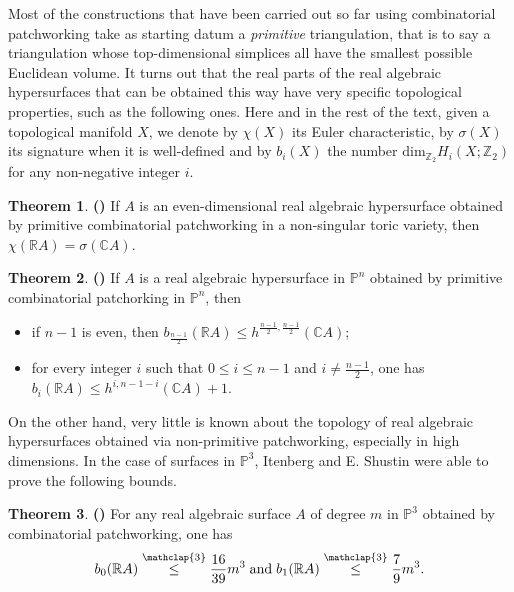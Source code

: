 \documentclass[12pt]{article}
\newcommand\customleqtrois{\stackrel{\mathclap{\normalfont\scriptsize\mbox{3}}}{\leq}}
\newcommand{\R}{\mathbb{R}}
\renewcommand{\P}{\mathbb{P}}
\newcommand{\Z}{\mathbb{Z}}
\theoremstyle{definition}
\newtheorem*{thm*}{Theorem}
\begin{document}
Most of the constructions that have been carried out so far using combinatorial patchworking take as starting datum a \textit{primitive} triangulation, that is to say a triangulation whose top-dimensional simplices all have the smallest possible Euclidean volume. It turns out that the real parts of the real algebraic hypersurfaces that can be obtained this way have very specific topological properties, such as the following ones. Here and in the rest of the text, given a topological manifold $X$, we denote by $\chi(X)$ its Euler characteristic, by $\sigma(X)$ its signature when it is well-defined and by $b_i(X)$ the number $\mathrm{dim}_{\Z_2} H_i(X;\Z_2)$ for any non-negative integer $i$.

\begin{thm*}
\label{thmbertrand}
\textbf{(\cite{bertrand_2010})} If $A$ is an even-dimensional real algebraic hypersurface obtained by primitive combinatorial patchworking in a non-singular toric variety, then $\chi(\mathbb{R}A) = \sigma(\mathbb{C}A)$.
\end{thm*}

\begin{thm*}
\textbf{(\cite{renaudineau})} If $A$ is a real algebraic hypersurface in $\mathbb{P}^n$ obtained by primitive combinatorial patchorking in $\mathbb{P}^n$, then
\begin{itemize}
    \item if $n-1$ is even, then $b_{\frac{n-1}{2}}(\mathbb{R}A) \leq h^{\frac{n-1}{2},\frac{n-1}{2}}(\mathbb{C}A)$;
    \item for every integer $i$ such that $0\leq i \leq n-1$ and $i \neq \frac{n-1}{2}$, one has $b_i(\mathbb{R}A) \leq h^{i,n-1-i}(\mathbb{C}A)+1$.
\end{itemize}
\end{thm*}

On the other hand, very little is known about the topology of real algebraic hypersurfaces obtained via non-primitive patchworking, especially in high dimensions. In the case of surfaces in $\P^3$, Itenberg and E. Shustin were able to prove the following bounds.

\begin{thm*}
    \textbf{(\cite{itenbergshustincritpts})} For any real algebraic surface $A$ of degree $m$ in $\P^3$ obtained by combinatorial patchworking, one has
    \begin{equation*}
        b_0(\R A) \customleqtrois \frac{16}{39}m^3 \; \mathrm{and} \; b_1(\R A) \customleqtrois \frac{7}{9}m^3.
    \end{equation*}
\end{thm*}
\end{document}
